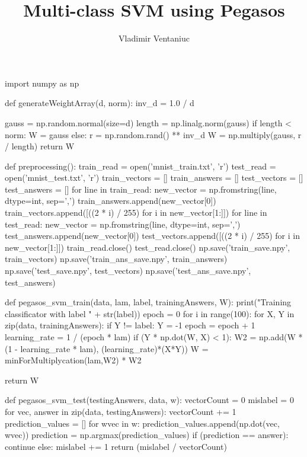 \documentclass[a4paper,12pt]{article}
\title{Multi-class SVM using Pegasos}
\author{Vladimir Ventaniuc}
\begin{document}
\maketitle


\begin{python}
import numpy as np

def generateWeightArray(d, norm):
    inv_d = 1.0 / d

    gauss = np.random.normal(size=d)
    length = np.linalg.norm(gauss)
    if length < norm:
        W = gauss
    else:
        r = np.random.rand() ** inv_d
        W = np.multiply(gauss, r / length)
    return W

def preprocessing():
    train_read = open('mnist_train.txt', 'r')
    test_read = open('mnist_test.txt', 'r')
    train_vectors = []
    train_answers = []
    test_vectors = []
    test_answers = []
    for line in train_read:
        new_vector = np.fromstring(line, dtype=int, sep=',')
        train_answers.append(new_vector[0])
        train_vectors.append([((2 * i) / 255) for i in new_vector[1:]])
    for line in test_read:
        new_vector = np.fromstring(line, dtype=int, sep=',')
        test_answers.append(new_vector[0])
        test_vectors.append([((2 * i) / 255) for i in new_vector[1:]])
    train_read.close()
    test_read.close()
    np.save('train_save.npy', train_vectors)
    np.save('train_ans_save.npy', train_answers)
    np.save('test_save.npy', test_vectors)
    np.save('test_ans_save.npy', test_answers)


def pegasos_svm_train(data, lam, label, trainingAnswers, W):
    print("Training classificator with label " + str(label))
    epoch = 0
    for i in range(100):
        for X, Y in zip(data, trainingAnswers):
            if Y != label:
                Y = -1
            epoch = epoch + 1
            learning_rate = 1 / (epoch * lam)
            if (Y * np.dot(W, X) < 1):
                W2 = np.add(W * (1 - learning_rate * lam), (learning_rate)*(X*Y))
                W = minForMultiplycation(lam,W2) * W2
           
    return W

def pegasos_svm_test(testingAnswers, data, w):
    vectorCount = 0
    mislabel = 0
    for vec, answer in zip(data, testingAnswers):
        vectorCount += 1
        prediction_values = []
        for wvec in w:
            prediction_values.append(np.dot(vec, wvec))
        prediction = np.argmax(prediction_values)
        if (prediction == answer):
            continue
        else:
            mislabel += 1
    return (mislabel / vectorCount)


\end{python}
\end{document}
